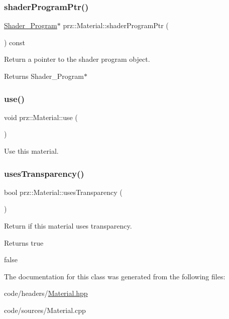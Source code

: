 \subsubsection{\texorpdfstring{shaderProgramPtr()}{shaderProgramPtr()}}
{\footnotesize\ttfamily \mbox{\hyperlink{classprz_1_1_shader___program}{Shader\+\_\+\+Program}}$\ast$ prz\+::\+Material\+::shader\+Program\+Ptr (\begin{DoxyParamCaption}{ }\end{DoxyParamCaption}) const\hspace{0.3cm}{\ttfamily [inline]}}



Return a pointer to the shader program object. 

\begin{DoxyReturn}{Returns}
Shader\+\_\+\+Program$\ast$ 
\end{DoxyReturn}
\mbox{\label{classprz_1_1_material_a82bf213bb5c6a403812dab39ac3d7e5a}} 
\subsubsection{\texorpdfstring{use()}{use()}}
{\footnotesize\ttfamily void prz\+::\+Material\+::use (\begin{DoxyParamCaption}{ }\end{DoxyParamCaption})}



Use this material. 

\mbox{\label{classprz_1_1_material_aa27abc0a7c69fa88cac4d075a082d78c}} 
\subsubsection{\texorpdfstring{usesTransparency()}{usesTransparency()}}
{\footnotesize\ttfamily bool prz\+::\+Material\+::uses\+Transparency (\begin{DoxyParamCaption}{ }\end{DoxyParamCaption})\hspace{0.3cm}{\ttfamily [inline]}}



Return if this material uses transparency. 

\begin{DoxyReturn}{Returns}
true 

false 
\end{DoxyReturn}


The documentation for this class was generated from the following files\+:\begin{DoxyCompactItemize}
\item 
code/headers/\mbox{\hyperlink{_material_8hpp}{Material.\+hpp}}\item 
code/sources/Material.\+cpp\end{DoxyCompactItemize}

